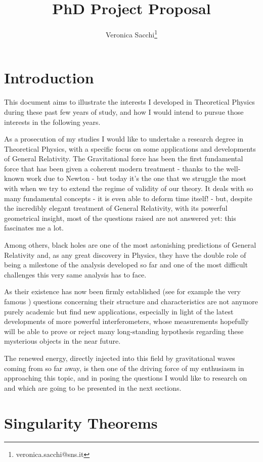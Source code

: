 \documentclass[12pt, a4paper]{article}
\title{PhD Project Proposal}
\author{Veronica Sacchi\thanks{veronica.sacchi@sns.it}}
\begin{document}
\maketitle

\section{Introduction}
This document aims to illustrate the interests I developed in Theoretical Physics during these past few years of study, and how I would intend to pursue those interests in the following years.

As a prosecution of my studies I would like to undertake a research degree in Theoretical Physics, with a specific focus on some applications and developments of General Relativity.
The Gravitational force has been the first fundamental force that has been given a coherent modern treatment - thanks to the well-known work due to Newton - but today it's the one that we struggle the most with when we try to extend the regime of validity of our theory.
It deals with so many fundamental concepts -  it is even able to deform time itself! - but, despite the incredibly elegant treatment of General Relativity, with its powerful geometrical insight, most of the questions raised are not answered yet: this fascinates me a lot.

Among others, black holes are one of the most astonishing predictions of General Relativity and, as any great discovery in Physics, they have the double role of being a milestone of the analysis developed so far and one of the most difficult challenges this very same analysis has to face.

As their existence has now been firmly established (see for example the very famous \cite{falcke1999viewing}) questions concerning their structure and characteristics are not anymore purely academic but find new applications, especially in light of the latest developments of more powerful interferometers, whose measurements hopefully will be able to prove or reject many long-standing hypothesis regarding these mysterious objects in the near future.

The renewed energy, directly injected into this field by gravitational waves coming from so far away, is then one of the driving force of my enthusiasm in approaching this topic, and in posing the questions I would like to research on and which are going to be presented in the next sections.
\clearpage

\section{Singularity Theorems}
\end{document}
